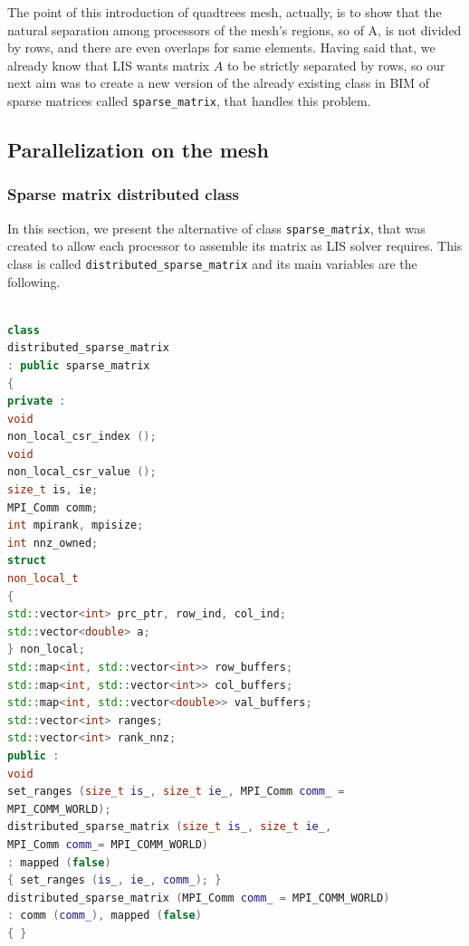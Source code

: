 The point of this introduction of quadtrees mesh, actually, is to show that the natural separation among processors of the mesh's regions, so of A, is not divided by rows, and there are even overlaps for same elements. Having said that, we already know that LIS wants matrix $ A $ to be strictly separated by rows, so our next aim was to create a new version of the already existing class in BIM of sparse matrices called \texttt{sparse\_matrix}, that handles this problem.
\subsection{Parallelization on the mesh}
\subsubsection{Sparse matrix distributed class}
In this section, we present the alternative of class \texttt{sparse\_matrix}, that was created to allow each processor to assemble its matrix as LIS solver requires. This class is called \texttt{distributed\_sparse\_matrix} and its main variables are the following. 
\\
\\
\begin{lstlisting}[language=C++, caption={class distributed\_sparse\_matrix}]
class
distributed_sparse_matrix
: public sparse_matrix
{
private :
void
non_local_csr_index ();
void
non_local_csr_value ();
size_t is, ie;
MPI_Comm comm;
int mpirank, mpisize;
int nnz_owned;
struct
non_local_t
{
std::vector<int> prc_ptr, row_ind, col_ind;
std::vector<double> a;
} non_local;
std::map<int, std::vector<int>> row_buffers;
std::map<int, std::vector<int>> col_buffers;
std::map<int, std::vector<double>> val_buffers;
std::vector<int> ranges;
std::vector<int> rank_nnz;
public :
void
set_ranges (size_t is_, size_t ie_, MPI_Comm comm_ =     
MPI_COMM_WORLD);
distributed_sparse_matrix (size_t is_, size_t ie_,
MPI_Comm comm_= MPI_COMM_WORLD)
: mapped (false)
{ set_ranges (is_, ie_, comm_); }
distributed_sparse_matrix (MPI_Comm comm_ = MPI_COMM_WORLD)
: comm (comm_), mapped (false)
{ }
\end{lstlisting}

